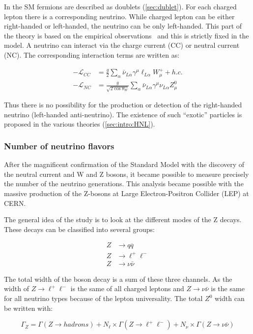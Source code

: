 \documentclass[../main.tex]{subfiles}
\begin{document}
In the SM fermions are described as doublets (\autoref{sec:dublet}). For each charged lepton there is a corresponding neutrino. While charged lepton can be either right-handed or left-handed, the neutrino can be only left-handed. This part of the theory is based on the empirical observations~\cite{Goldhaber1958} and this is strictly fixed in the model. A neutrino can interact via the charge current (CC) or neutral current (NC). The corresponding interaction terms are written as:

\begin{align}
-\mathcal{L}_{CC}&=\frac{g}{2}\sum_\alpha\bar{\nu}_{L\alpha}\gamma^\mu\ell_{L\alpha}W^+_\mu+h.c. \\ \nonumber
-\mathcal{L}_{NC}&=\frac{g}{\sqrt{2\cos{\theta_W}}}\sum_\alpha\bar{\nu}_{L\alpha}\gamma^\mu\nu_{L\alpha}Z^0_\mu
\end{align}

Thus there is no possibility for the production or detection of the right-handed neutrino (left-handed anti-neutrino). The existence of such ``exotic'' particles is proposed in the various theories (\autoref{sec:intro:HNL}).

\subsubsection{Number of neutrino flavors}
\label{sec:intro:LEP}
After the magnificent confirmation of the Standard Model with the discovery of the neutral current and W and Z bosons, it became possible to measure precisely the number of the neutrino generations. This analysis became possible with the massive production of the Z-bosons at Large Electron-Positron Collider (LEP) at CERN.

The general idea of the study is to look at the different modes of the Z decays. These decays can be classified into several groups:

\begin{align}
Z&\to q\overline{q} \nonumber \\
Z&\to \ell^+\ell^- \\
Z&\to \nu\bar{\nu} \nonumber
\end{align}

The total width of the boson decay is a sum of these three channels. As the width of $Z\to \ell^+\ell^-$ is the same of all charged leptons and $Z\to \nu\bar{\nu}$ is the same for all neutrino types because of the lepton universality. The total $Z^0$ width can be written with:

\begin{equation}
\Gamma_Z=\Gamma(Z\to hadrons)+N_{\ell}\times\Gamma(Z\to \ell^+\ell^-) + N_{\nu}\times\Gamma(Z\to \nu\bar{\nu})
\label{eq:intro:nnu}
\end{equation}
\end{document}

